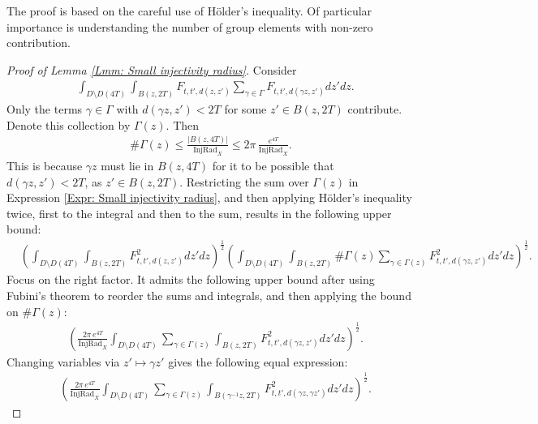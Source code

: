 \documentclass[11pt,twoside,reqno]{amsart} \usepackage{a4wide} \usepackage[T1]{fontenc} \usepackage[utf8]{inputenc} \usepackage{soul}  \usepackage{amsmath} \usepackage{amsfonts} \usepackage{amssymb} \usepackage{mathtools} \usepackage{amsthm} \usepackage{xcolor} \usepackage{graphicx} \usepackage{hyperref} \usepackage{standalone} \usepackage{esint} \usepackage{comment} \usepackage[left=2.3cm,top=3cm,right=2.3cm]{geometry} \usepackage{bm} \usepackage{svg} \usepackage{float} \numberwithin{equation}{section} \theoremstyle{plain} \newtheorem{thm}{Theorem}[section] \newtheorem{theorem}[thm]{Theorem} \newtheorem*{theorem*}{Theorem}\newtheorem{conj}[thm]{Conjecture} \newtheorem{lemma}[thm]{Lemma} \newtheorem{prop}[thm]{Proposition} \newtheorem{proposition}[thm]{Proposition} \newtheorem{cor}[thm]{Corollary} \newtheorem{question}[thm]{Question} \newtheorem{corollary}[thm]{Corollary} \newtheorem{assumption}[thm]{Assumption} \theoremstyle{definition} \newtheorem{defn}[thm]{Definition} \newtheorem{choice}[thm]{Choice} \newtheorem{definition}[thm]{Definition} \newtheorem{ex}[thm]{Example} \newtheorem{notation}[thm]{Notation} \newtheorem*{ack}{Acknowledgements} \theoremstyle{remark} \newtheorem{remark}[thm]{Remark} \newtheorem{bigremark}[thm]{Remark} \usepackage{xcolor} \newcommand{\red}[1]{ {\color{Red}#1} } \newcommand{\blue}[1]{ {\color{Blue}#1} } \author{Kai Hippi} \address{Aalto University, Espoo, Finland} \email{kai.hippi@aalto.fi}
\begin{document}
The proof is based on the careful use of Hölder's inequality. Of particular importance is understanding the number of group elements with non-zero contribution.

\begin{proof}[Proof of Lemma \ref{Lmm: Small injectivity radius}]
	Consider 
	\begin{align}
		&
		\label{Expr: Small injectivity radius}
		\int_{D \setminus D( 4T )} \int_{ B( z, 2T ) }   F_{t,t', d( z,z' )}  \sum_{\gamma \in \Gamma}^{} F_{t,t', d( \gamma z, z' )} dz' dz.
	\end{align}
	Only the terms $ \gamma \in \Gamma $ with $ d( \gamma z, z' ) < 2T $ for some $ z' \in B( z,2T ) $ contribute. Denote this collection by $ \Gamma( z ) $. Then
	\begin{align*}
		\# \Gamma( z ) \leq \frac{ | B( z,4T ) | }{ \operatorname{InjRad}_{X} } \leq 2 \pi \, \frac{e^{4T}}{\operatorname{InjRad}_{X}}.
	\end{align*}
	This is because \( \gamma z \) must lie in \( B(z, 4T) \) for it to be possible that \( d(\gamma z, z') < 2T \), as \( z' \in B(z, 2T) \). Restricting the sum over \( \Gamma(z) \) in Expression \eqref{Expr: Small injectivity radius}, and then applying Hölder's inequality twice, first to the integral and then to the sum, results in the following upper bound:
	\begin{align}
		&
		\label{Expr: New small InjRad}
		 \left( \int_{D \setminus D( 4T )} \int_{B( z,2T )} F_{t,t', d( z,z' ) }^{2} dz' dz \right)^{\frac{1}{2}} \left( \int_{D \setminus D( 4T )} \int_{B( z,2T )}  \#\Gamma( z ) \sum_{\gamma \in \Gamma( z )}^{} F_{t,t', d( \gamma z,z' ) }^{2}  dz' dz \right)^{\frac{1}{2}}.
	\end{align}
	Focus on the right factor. It admits the following upper bound after using Fubini's theorem to reorder the sums and integrals, and then applying the bound on \( \# \Gamma(z) \):
	\begin{align*}
		&
		\left( \frac{2\pi \, e^{4T}}{ \operatorname{InjRad}_{X} } \int_{D \setminus D( 4T )} \sum_{\gamma \in \Gamma( z )}^{} \int_{B( z,2T )}   F_{t,t', d( \gamma z,z' ) }^{2}  dz' dz \right)^{\frac{1}{2}}.
	\end{align*}
	Changing variables via \( z' \mapsto \gamma z' \) gives the following equal expression:
	\begin{align*}
		&
		\left( \frac{2\pi \, e^{4T}}{ \operatorname{InjRad}_{X} } \int_{D \setminus D( 4T )} \sum_{\gamma \in \Gamma( z )}^{} \int_{B( \gamma^{-1} z,2T )}   F_{t,t', d( \gamma z, \gamma z' ) }^{2}  dz' dz \right)^{\frac{1}{2}}.

\end{align*}
\end{proof}
\end{document}
